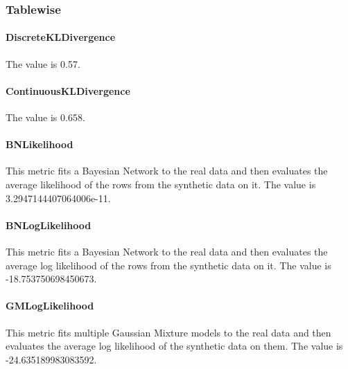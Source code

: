 \documentclass{article}
\begin{document}
    

\subsubsection{Tablewise}

\paragraph{DiscreteKLDivergence}

The value is 0.57.\\

\paragraph{ContinuousKLDivergence}
The value is 0.658.\\


\paragraph{BNLikelihood}

This metric fits a Bayesian Network to the real data and then evaluates the average likelihood of the rows from the synthetic data on it. 
The value is 3.2947144407064006e-11.\\

\paragraph{BNLogLikelihood}

This metric fits a Bayesian Network to the real data and then evaluates the average log likelihood of the rows from the synthetic data on it.
The value is -18.753750698450673.\\


\paragraph{GMLogLikelihood}

This metric fits multiple Gaussian Mixture models to the real data and then evaluates the average log likelihood of the synthetic data on them.
The value is -24.635189983083592.\\
\end{document}

